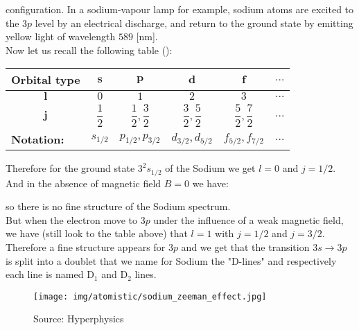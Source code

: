 	\begin{tcolorbox}[colframe=black,colback=white,sharp corners]
	
	configuration. In a sodium-vapour lamp for example, sodium atoms are excited to the $3p$ level by an electrical discharge, and return to the ground state by emitting yellow light of wavelength $589$ [nm].\\
	
	Now let us recall the following table ():
	\begin{table}[H]
		\centering
		\renewcommand{\arraystretch}{2.6}
		\begin{tabular}{|c|c|c|c|c|c|}
		\hline
		\rowcolor[HTML]{9B9B9B} 
		\textbf{Orbital type} & \textbf{$\pmb{s}$} & \textbf{$\pmb{p}$} & \textbf{$\pmb{d}$} & \textbf{$\pmb{f}$} & \textbf{$\pmb{\ldots}$} \\ \hline
		\cellcolor[HTML]{9B9B9B}\textbf{$\pmb{l}$} & $0$ & $1$ & $2$ & $3$ & $\ldots$ \\ \hline
		\cellcolor[HTML]{9B9B9B}\textbf{$\pmb{j}$} & $\dfrac{1}{2}$ & $\dfrac{1}{2},\dfrac{3}{2}$ & $\dfrac{3}{2},\dfrac{5}{2}$ & $\dfrac{5}{2},\dfrac{7}{2}$ & $\ldots$ \\ \hline
		\multicolumn{1}{|l|}{\cellcolor[HTML]{9B9B9B}\textbf{Notation:}} & $s_{1/2}$ & $p_{1/2},p_{3/2}$ & $d_{3/2},d_{5/2}$ & $f_{5/2},f_{7/2}$ & $\ldots$ \\ \hline
		\end{tabular}
	\end{table}
	Therefore for the ground state $3^2s_{1/2}$ of the Sodium we get $l=0$ and $j=1/2$. And in the absence of magnetic field $B=0$ we have:
	
	so there is no fine structure of the Sodium spectrum.\\
	
	But when the electron move to $3p$ under the influence of a weak magnetic field, we have (still look to the table above) that $l=1$ with $j=1/2$ and $j=3/2$. \\
	
	Therefore a fine structure appears for $3p$ and we get that the transition $3s\rightarrow 3p$ is split into a doublet that we name for Sodium the "D-lines" and respectively each line is named $\text{D}_1$ and $\text{D}_2$ lines. 
	\begin{figure}[H]
		\centering
		\texttt{[image: img/atomistic/sodium\_zeeman\_effect.jpg]}	
		\caption[]{Source: Hyperphysics}
	\end{figure}
	\end{tcolorbox}
	
